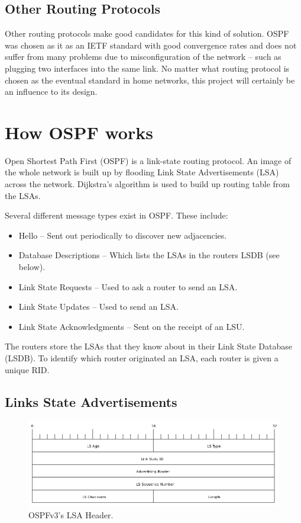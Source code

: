 \documentclass[12pt,a4paper,twoside]{report}
\begin{document}
\subsection{Other Routing Protocols}
Other routing protocols make good candidates for this kind of solution. OSPF
was chosen as it as an IETF standard with good convergence rates and does not
suffer from many problems due to misconfiguration of the network -- such as
plugging two interfaces into the same link. No matter what routing protocol is
chosen as the eventual standard in home networks, this project will certainly
be an influence to its design.

\section{How OSPF works}
Open Shortest Path First (OSPF) is a link-state routing protocol. An image of
the whole network is built up by flooding Link State Advertisements (LSA)
across the network. Dijkstra's algorithm is used to build up routing table from
the LSAs.

Several different message types exist in OSPF\@. These include:
\begin{itemize}
 \item Hello -- Sent out periodically to discover new adjacencies.
 \item Database Descriptions -- Which lists the LSAs in the routers LSDB (see below).
 \item Link State Requests -- Used to ask a router to send an LSA.
 \item Link State Updates -- Used to send an LSA.
 \item Link State Acknowledgments -- Sent on the receipt of an LSU.
\end{itemize}

The routers store the LSAs that they know about in their Link State Database
(LSDB). To identify which router
originated an LSA, each router is given a unique RID.

\subsection{Links State Advertisements}
\begin{figure}
\begin{center}
	\includegraphics[width=\linewidth]{../Diagrams/Packets/LSA-header.png}
	\caption{OSPFv3's LSA Header.}\label{fig:LSA-header}
\end{center}
\end{figure}
\end{document}
